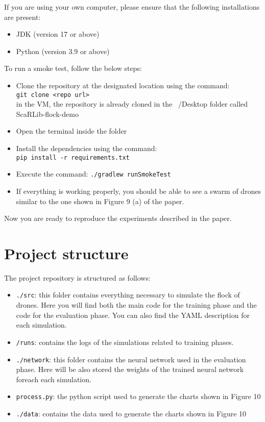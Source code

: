 \documentclass[runningheads]{llncs}
\begin{document}
If you are using your own computer, please ensure that the following installations are present:
\begin{itemize}
  \item JDK (version 17 or above)
  \item Python (version 3.9 or above)
\end{itemize}
To run a smoke test, follow the below steps:
\begin{itemize}
  \item Clone the repository at the designated location using the command: \\\lstinline|git clone <repo url>| \\in the VM, the repository is already cloned in the ~/Desktop folder called ScaRLib-flock-demo
  \item Open the terminal inside the folder
  \item Install the dependencies using the command: \\ \lstinline|pip install -r requirements.txt|
  \item Execute the command: \lstinline|./gradlew runSmokeTest|
  \item If everything is working properly, you should be able to see a swarm of drones similar to the one shown in Figure 9 (a) of the paper.
\end{itemize}
Now you are ready to reproduce the experiments described in the paper.

\section{Project structure}

The project repository is structured as follows:
\begin{itemize}
  \item \texttt{./src}: 
  this folder contains everything necessary to simulate the flock of drones. Here you will find both the main code for the training phase and the code for the evaluation phase. You can also find the YAML description for each simulation.

  \item \texttt{/runs}: contains the logs of the simulations related to training phases.
  
  \item \texttt{./network}: this folder contains the neural network used in the evaluation phase. Here will be also stored the weights of the trained neural network foreach each simulation.
  
  \item \texttt{process.py}: the python script used to generate the charts shown in Figure 10
  
  \item \texttt{./data}: contains the data used to generate the charts shown in Figure 10
\end{itemize}
\end{document}
